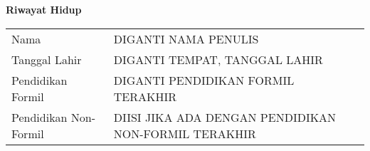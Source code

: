 \newpage %

\begin{center}
\begin{large}\textbf{Riwayat Hidup}\\\end{large}
\end{center}
\vspace{5mm}

\begin{tabular}{ll}
Nama&
DIGANTI NAMA PENULIS\tabularnewline
Tanggal Lahir&
DIGANTI TEMPAT, TANGGAL LAHIR\tabularnewline
Pendidikan Formil&
DIGANTI PENDIDIKAN FORMIL TERAKHIR\tabularnewline
Pendidikan Non-Formil&
DIISI JIKA ADA DENGAN PENDIDIKAN NON-FORMIL TERAKHIR\tabularnewline
\end{tabular}